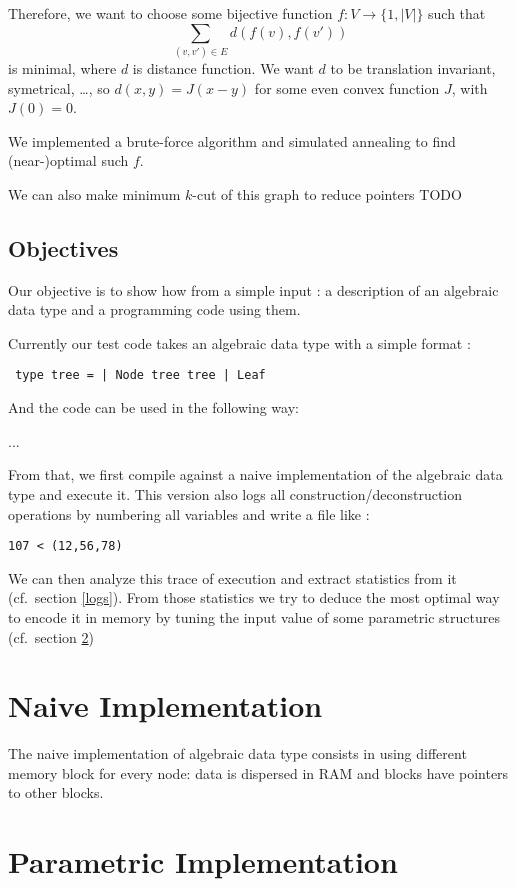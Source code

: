 \documentclass[12pt]{article}
\begin{document}
Therefore, we want to choose some bijective function $f : V \to \{1, |V|\}$ such that \[ \sum_{(v, v') \in E} d(f(v), f(v')) \] is minimal, where $d$ is distance function.
We want $d$ to be translation invariant, symetrical, \dots, so $d(x, y) = J(x-y)$ for some even convex function $J$, with $J(0) = 0$.

We implemented a brute-force algorithm and simulated annealing to find (near-)optimal such $f$.

We can also make minimum $k$-cut of this graph to reduce pointers TODO

\subsection{Objectives}

Our objective is to show how from a simple input : a description of an algebraic
data type and a programming code using them.

Currently our test code takes an algebraic data type with a simple format :

\verb$ type tree = | Node tree tree | Leaf$

And the code can be used in the following way:

...

From that, we first compile against a naive implementation of the algebraic data type
and execute it. This version also logs all construction/deconstruction operations by
numbering all variables and write a file like :

\verb$107 < (12,56,78)$

We can then analyze this trace of execution and extract statistics from it (cf.\ 
section \ref{logs}). From
those statistics we try to deduce the most optimal way to encode it in memory by
tuning the input value of some parametric structures (cf.\ section \ref{paramImplem})




\section{Naive Implementation}

The naive implementation of algebraic data type consists in using different memory
block for every node: data is dispersed in RAM and blocks have pointers to
other blocks.



\section{Parametric Implementation}
\label{paramImplem}
\end{document}
